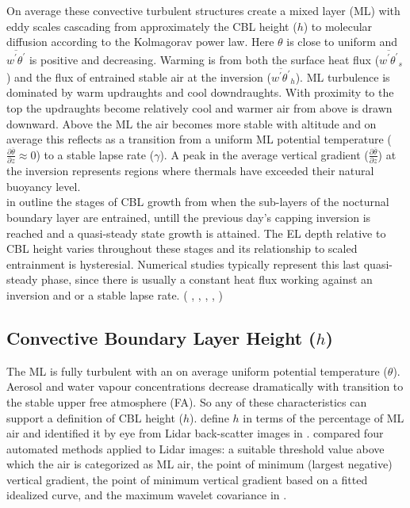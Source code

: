 On average these convective turbulent structures create a mixed layer (\acs{ML}) with eddy scales cascading from approximately the \acs{CBL} height 
($h$) to molecular diffusion according to the Kolmagorav power law.  Here $\theta$ is close to uniform and $\overline{w^{'}\theta^{'}}$ is positive and decreasing. Warming is from both the surface heat flux ($\overline{w^{'}\theta^{'}}_{s}$) and the flux of entrained stable air at the
 inversion ($\overline{w^{'}\theta^{'}}_{h}$).  \acs{ML} turbulence is dominated by warm updraughts and cool downdraughts.  With proximity
to the top the updraughts become relatively cool and warmer air from above is drawn downward.  Above the \acs{ML} the air becomes more stable with altitude and on average this reflects as a transition from a uniform \acs{ML} potential temperature ($\frac{\partial \overline{\theta}}{\partial z} \approx 0$) to a stable lapse rate ($\gamma$).  A peak in the average vertical gradient ($\frac{\partial \overline{\theta}}{\partial z}$) at the inversion represents regions where thermals have exceeded their natural buoyancy level. \\

\citeauthor{StullNelEl} in \cite{StullNelEl} outline the stages of \acs{CBL} growth from when the sub-layers of the nocturnal
boundary layer are entrained, untill the previous day's capping inversion is reached and a quasi-steady state growth 
is attained.  The \acs{EL} depth relative to \acs{CBL} height varies throughout these stages and its relationship
to scaled entrainment is hysteresial.  Numerical studies typically represent this last quasi-steady
phase, since there is usually a constant heat flux working against an inversion and or a stable lapse rate. 
(\citeauthor{SchmidtSchu} \cite{SchmidtSchu}, \citeauthor{Sorbjan} \cite{Sorbjan}, \citeauthor{SullMoengStev} \cite{SullMoengStev}, 
\citeauthor{FedConzMir04} \cite{FedConzMir04}, \citeauthor{BrooksFowler2} \cite{BrooksFowler2})  

\subsection{Convective Boundary Layer Height ($h$)}
\label{subsec:}

The \acs{ML} is fully turbulent with an on average uniform potential temperature ($\theta$). Aerosol and water vapour concentrations 
decrease dramatically with transition to the stable upper free atmosphere (\acs{FA}).  So any of these characteristics can support
a definition of \acs{CBL} height ($h$).  \citeauthor{StullNelEl} define $h$ in terms of the percentage of \acs{ML} air
and identified it by eye from Lidar back-scatter images in \cite{StullNelEl}.  \citeauthor{Traum11} compared
four automated methods applied to Lidar images: a suitable threshold value 
above which the air is categorized as \acs{ML} air,  the point of minimum (largest negative) 
vertical gradient, the point of minimum vertical gradient based on a fitted idealized curve, 
and the maximum wavelet covariance in \cite{Traum11}.\\

